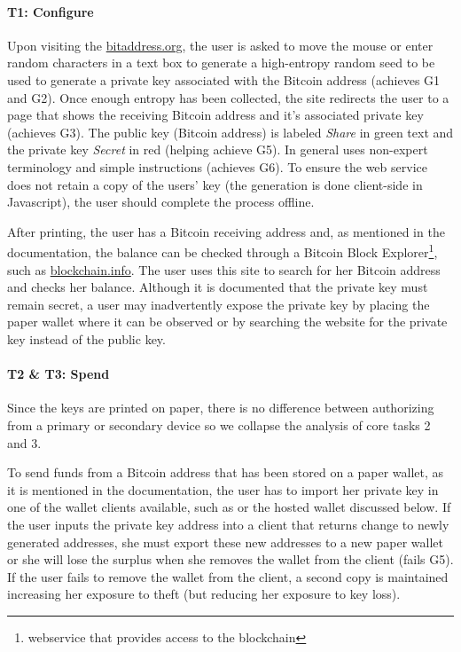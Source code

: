 \paragraph{T1: Configure} Upon visiting the \url{bitaddress.org}, the user is asked to move the mouse or enter random characters in a text box to generate a high-entropy random seed to be used to generate a private key associated with the Bitcoin address (achieves G1 and G2). Once enough entropy has been collected, the site redirects the user to a page that shows the receiving Bitcoin address and it's associated private key (achieves G3). The public key (Bitcoin address) is labeled \emph{Share} in green text and the private key \emph{Secret} in red (helping achieve G5). In general \paper uses non-expert terminology and simple instructions (achieves G6). To ensure the web service does not retain a copy of the users' key (the generation is done client-side in Javascript), the user should complete the process offline.

After printing, the user has a Bitcoin receiving address and, as mentioned in the documentation, the balance can be checked through a Bitcoin Block Explorer\footnote{webservice that provides access to the blockchain}, such as \url{blockchain.info}. The user uses this site to search for her Bitcoin address and checks her balance. Although it is documented that the private key must remain secret, a user may inadvertently expose the private key by placing the paper wallet where it can be observed or by searching the website for the private key instead of the public key. %

\paragraph{T2 \& T3: Spend} Since the keys are printed on paper, there is no difference between authorizing from a primary or secondary device so we collapse the analysis of core tasks 2 and 3.
 
To send funds from a Bitcoin address that has been stored on a paper wallet, as it is mentioned in the documentation, the user has to import her private key in one of the wallet clients available, such as \armory or the \block hosted wallet discussed below. If the user inputs the private key address into a client that returns change to newly generated addresses, she must export these new addresses to a new paper wallet or she will lose the surplus when she removes the wallet from the client (fails G5). If the user fails to remove the wallet from the client, a second copy is maintained increasing her exposure to theft (but reducing her exposure to key loss). 

